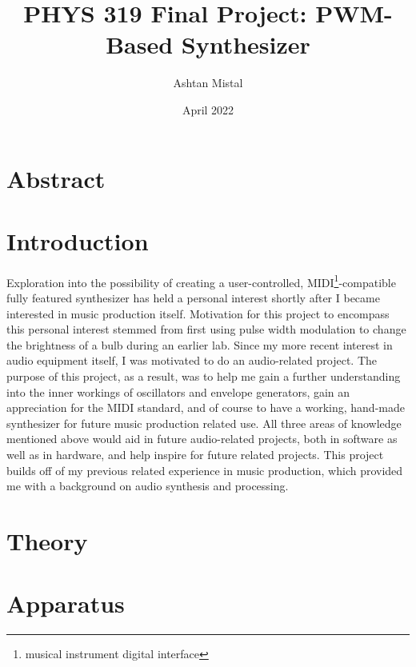 \documentclass[10pt]{article}
\title{PHYS 319 Final Project: PWM-Based Synthesizer}
\author{Ashtan Mistal}
\date{April 2022}
\begin{document}
\maketitle

\break

\tableofcontents{}

\break

\section{Abstract}\label{sec:abstract}


\section{Introduction}\label{sec:introduction}

Exploration into the possibility of creating a user-controlled, MIDI\footnote{musical instrument digital interface}-compatible fully featured synthesizer has held a personal interest shortly after I became interested in music production itself.
Motivation for this project to encompass this personal interest stemmed from first using pulse width modulation to change the brightness of a bulb during an earlier lab.
Since my more recent interest in audio equipment itself, I was motivated to do an audio-related project.
The purpose of this project, as a result, was to help me gain a further understanding into the inner workings of oscillators and envelope generators, gain an appreciation for the MIDI standard, and of course to have a working, hand-made synthesizer for future music production related use.
All three areas of knowledge mentioned above would aid in future audio-related projects, both in software as well as in hardware, and help inspire for future related projects.
This project builds off of my previous related experience in music production, which provided me with a background on audio synthesis and processing.

\section{Theory}\label{sec:theory}


\section{Apparatus}\label{sec:apparatus}

\end{document}
